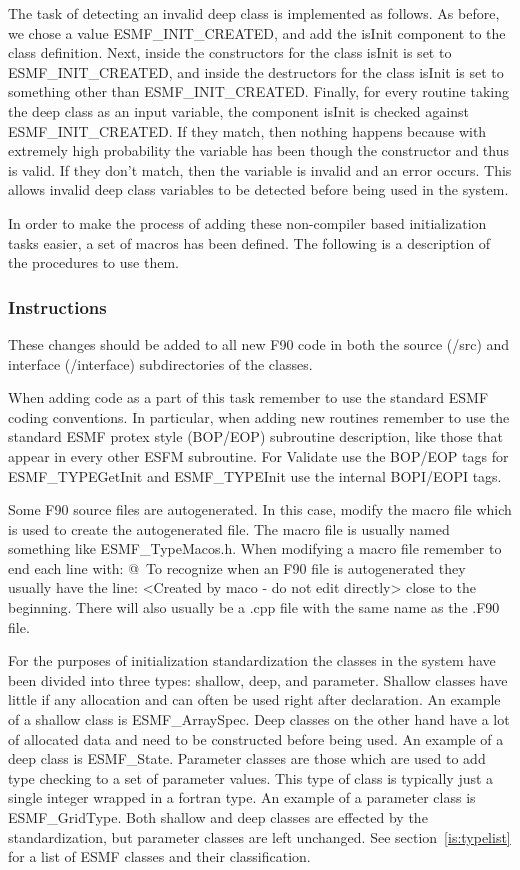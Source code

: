  The task of detecting an invalid deep class is
implemented as follows. As before, we chose a value
ESMF\_INIT\_CREATED, and add the isInit component to the class
definition. Next, inside the constructors for
the class isInit is set to ESMF\_INIT\_CREATED, and
inside the destructors for the class isInit
is set to something other than ESMF\_INIT\_CREATED.
Finally, for every routine taking the deep class
as an input variable, the component isInit is
checked against ESMF\_INIT\_CREATED. If they match, then
nothing happens because with extremely high
probability the variable has been though the
constructor and thus is valid. If they don't match,
then the variable is invalid and an error occurs.
This allows invalid deep class variables to be detected
before being used in the system.

 In order to make the process of adding these non-compiler
based initialization tasks easier, a set of macros has been defined.
The following is a description of the procedures to use them.

\subsubsection{Instructions}

 These changes should be added to all new F90 code in both the source
(/src) and interface (/interface) subdirectories of the classes.

 When adding code as a part of this task remember to use
the standard ESMF coding conventions. In particular, when adding 
new routines remember to use the standard 
ESMF protex style (BOP/EOP) subroutine description, like those that
appear in every other ESFM subroutine. For Validate use 
the BOP/EOP tags for ESMF\_TYPEGetInit and ESMF\_TYPEInit 
use the internal BOPI/EOPI tags. 

 Some F90 source files are autogenerated. In this case, modify
the macro file which is used to create the autogenerated file. 
The macro file is usually named something like ESMF\_TypeMacos.h.
When modifying a macro file remember to end each line
with: @\ To recognize when an F90 file is autogenerated
they usually have the line: <Created by maco - do not edit directly>
close to the beginning. There will also usually be a .cpp
file with the same name as the .F90 file.

 For the purposes of initialization standardization the 
classes in the system have been divided into three types: shallow, deep,
and parameter. Shallow classes have little if any allocation and
can often be used right after declaration. An example of a shallow
class is ESMF\_ArraySpec.  Deep classes on the other hand  have a lot of
allocated data and need to be constructed before being used. An example of
a deep class is ESMF\_State. Parameter classes are 
those which are used to add type checking to a set of parameter values.
This type of class is typically just a single integer wrapped in a fortran type.
An example of a parameter class is ESMF\_GridType. Both shallow and
deep classes are effected by the standardization, but parameter classes
are left unchanged. See section~\ref{is:typelist} for a list of
ESMF classes and their classification. 

